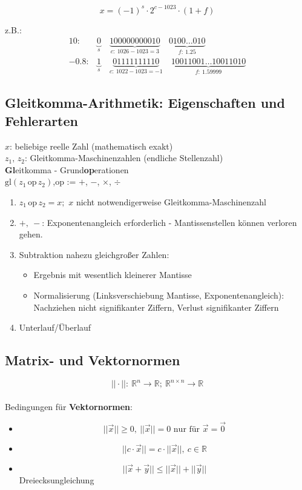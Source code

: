 \[ x = (-1)^s \cdot 2 ^{c-1023}\cdot (1 + f)\]

z.B.: 
\begin{align*}
10:& \underbrace{0}_{s} \quad \underbrace{100000000010}_{c:\ 1026-1023=3}\quad\underbrace{0100\ldots010}_{f:\ \num{1.25}}\\
\num{-0.8}:& \underbrace{1}_{s} \quad \underbrace{01111111110}_{c:\ 1022-1023=-1}\quad\underbrace{10011001\ldots10011010}_{f:\ \num{1.59999}}
\end{align*}

\subsection{Gleitkomma-Arithmetik: Eigenschaften und Fehlerarten}
$x$: beliebige reelle Zahl (mathematisch exakt)\\
$z_1,\,z_2$: Gleitkomma-Maschinenzahlen (endliche Stellenzahl)\\
\textbf{Gl}eitkomma - Grund\textbf{op}erationen\\
$\text{gl}(z_1\, \text{op}\, z_2)$,\quad op := $+$, $-$, $\times$, $\div$
\begin{enumerate}[label=\alph*)]
\item $z_1 \, \text{op}\, z_2 = x;$ \quad $x$ nicht notwendigerweise Gleitkomma-Maschinenzahl
\item $+,\ -$: Exponentenangleich erforderlich - Mantissenstellen können verloren gehen.
\item Subtraktion nahezu gleichgroßer Zahlen:
	\begin{itemize}
	\item Ergebnis mit wesentlich kleinerer Mantisse
	\item Normalisierung (Linksverschiebung Mantisse, Exponentenangleich): Nachziehen nicht signifikanter Ziffern, Verlust signifikanter Ziffern
	\end{itemize}
\item Unterlauf/Überlauf
\end{enumerate}

\subsection{Matrix- und Vektornormen}

\[||\cdot||:\ \mathbb{R}^n \rightarrow \mathbb{R};\ \mathbb{R}^{n\times n} \rightarrow \mathbb{R}\]\\
Bedingungen für \textbf{Vektornormen}:
\begin{itemize}
\item \[||\vec{x}|| \geq 0,\ ||\vec{x}|| = 0 \text{ nur für } \vec{x} = \vec{0}\]
\item \[||c \cdot\vec{x}|| = c \cdot ||\vec{x}||,\ c \in \mathbb{R}\]
\item \[||\vec{x} + \vec{y}|| \leq ||\vec{x}|| + ||\vec{y}||\] Dreiecksungleichung
\end{itemize}


